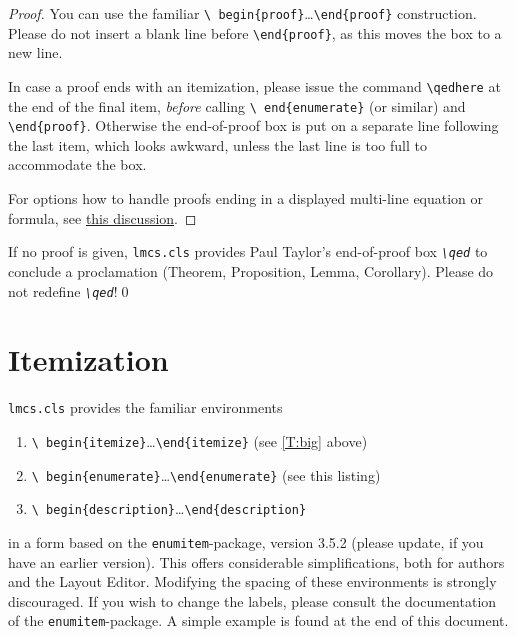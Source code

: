 \documentclass{lmcs} %
\theoremstyle{plain}\newtheorem{satz}[thm]{Satz} %
\begin{document}
\begin{proof} You can use the familiar \texttt{\textbackslash
    begin\{proof\}}\dots\texttt{\textbackslash end\{proof\}}
  construction.  Please do not insert a blank line before
  \texttt{\textbackslash end\{proof\}}, as this moves the box to a new
  line.

  In case a proof ends with an itemization,
  please issue the command \texttt{\textbackslash qedhere} at the end
  of the final item, \emph{before} calling \texttt{\textbackslash
    end\{enumerate\}} (or similar) and \texttt{\textbackslash end\{proof\}}.
  Otherwise the end-of-proof box is put on a separate line
  following the last item, which looks awkward, unless the last line
  is too full to accommodate the box.

  For options how to handle proofs ending in a displayed multi-line
  equation or formula, see
  \href{http://tex.stackexchange.com/questions/101929/qed-or-qedhere-at-the-end-of-split-environment}{this
    discussion}.
\end{proof}

\begin{cor}\label{C:big}
  If no proof is given, \texttt{lmcs.cls} provides Paul Taylor's
  end-of-proof box \emph{\texttt{\textbackslash qed}} to conclude a
  proclamation (Theorem, Proposition, Lemma, Corollary).  Please do
  not redefine \emph{\texttt{\textbackslash qed}}!\qed
\end{cor}

\section{Itemization}\label{S:item}
  \texttt{lmcs.cls} provides the familiar environments
\begin{enumerate}
\item\texttt{\textbackslash
  begin\{itemize\}}\dots\texttt{\textbackslash end\{itemize\}} (see
 \autoref{T:big} above)
\item\texttt{\textbackslash
  begin\{enumerate\}}\dots\texttt{\textbackslash end\{enumerate\}}
  (see this listing)
\item\texttt{\textbackslash
    begin\{description\}}\dots\texttt{\textbackslash end\{description\}}
\end{enumerate}
  in a form based on the \texttt{enumitem}-package, version 3.5.2
  (please update, if you have an earlier version).  This offers
  considerable simplifications, both for authors and the Layout
  Editor.  Modifying the spacing of these environments is strongly
  discouraged.  If you wish to change the labels, please consult the
  documentation of the \texttt{enumitem}-package.  A simple example is
  found at the end of this document.
\end{document}
